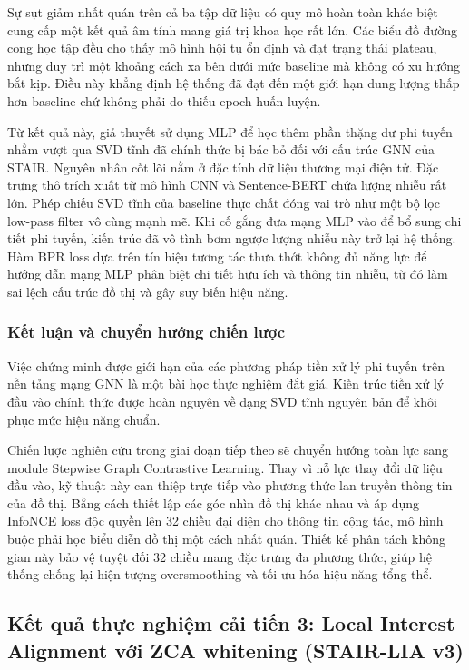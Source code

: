 Sự sụt giảm nhất quán trên cả ba tập dữ liệu có quy mô hoàn toàn khác biệt cung cấp một kết quả âm tính mang giá trị khoa học rất lớn. Các biểu đồ đường cong học tập đều cho thấy mô hình hội tụ ổn định và đạt trạng thái plateau, nhưng duy trì một khoảng cách xa bên dưới mức baseline mà không có xu hướng bắt kịp. Điều này khẳng định hệ thống đã đạt đến một giới hạn dung lượng thấp hơn baseline chứ không phải do thiếu epoch huấn luyện. 

Từ kết quả này, giả thuyết sử dụng MLP để học thêm phần thặng dư phi tuyến nhằm vượt qua SVD tĩnh đã chính thức bị bác bỏ đối với cấu trúc GNN của STAIR. Nguyên nhân cốt lõi nằm ở đặc tính dữ liệu thương mại điện tử. Đặc trưng thô trích xuất từ mô hình CNN và Sentence-BERT chứa lượng nhiễu rất lớn. Phép chiếu SVD tĩnh của baseline thực chất đóng vai trò như một bộ lọc low-pass filter vô cùng mạnh mẽ. Khi cố gắng đưa mạng MLP vào để bổ sung chi tiết phi tuyến, kiến trúc đã vô tình bơm ngược lượng nhiễu này trở lại hệ thống. Hàm BPR loss dựa trên tín hiệu tương tác thưa thớt không đủ năng lực để hướng dẫn mạng MLP phân biệt chi tiết hữu ích và thông tin nhiễu, từ đó làm sai lệch cấu trúc đồ thị và gây suy biến hiệu năng.

\subsubsection{Kết luận và chuyển hướng chiến lược}

Việc chứng minh được giới hạn của các phương pháp tiền xử lý phi tuyến trên nền tảng mạng GNN là một bài học thực nghiệm đắt giá. Kiến trúc tiền xử lý đầu vào chính thức được hoàn nguyên về dạng SVD tĩnh nguyên bản để khôi phục mức hiệu năng chuẩn. 

Chiến lược nghiên cứu trong giai đoạn tiếp theo sẽ chuyển hướng toàn lực sang module Stepwise Graph Contrastive Learning. Thay vì nỗ lực thay đổi dữ liệu đầu vào, kỹ thuật này can thiệp trực tiếp vào phương thức lan truyền thông tin của đồ thị. Bằng cách thiết lập các góc nhìn đồ thị khác nhau và áp dụng InfoNCE loss độc quyền lên 32 chiều đại diện cho thông tin cộng tác, mô hình buộc phải học biểu diễn đồ thị một cách nhất quán. Thiết kế phân tách không gian này bảo vệ tuyệt đối 32 chiều mang đặc trưng đa phương thức, giúp hệ thống chống lại hiện tượng oversmoothing và tối ưu hóa hiệu năng tổng thể.

\subsection{Kết quả thực nghiệm cải tiến 3: Local Interest Alignment với ZCA whitening (STAIR-LIA v3)}

